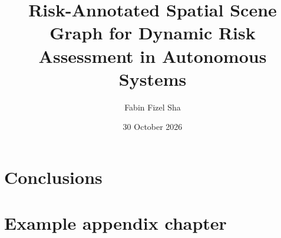\documentclass[ a4paper,
                oneside,
                toc=bibliography,
                toc=listof
                ]{scrbook}
\author{Fabin Fizel Sha}
\title{Risk-Annotated Spatial Scene Graph for Dynamic Risk Assessment in Autonomous Systems}
\date{30 October 2026}
\begin{document}
    \frontmatter
    \makeIAStitle

    \cleardoublepage
    
    \acresetall
    \cleardoublepage

    \tableofcontents
    \cleardoublepage
    \listoffigures
    \cleardoublepage
    \listoftables
     \cleardoublepage
    \cleardoublepage




    \mainmatter

    
    
    
    

    \chapter{Conclusions}


    \cleardoublepage
    \printbibliography

    \appendix
    \chapter{Example appendix chapter}

    \declarationOfOriginality
\end{document}
